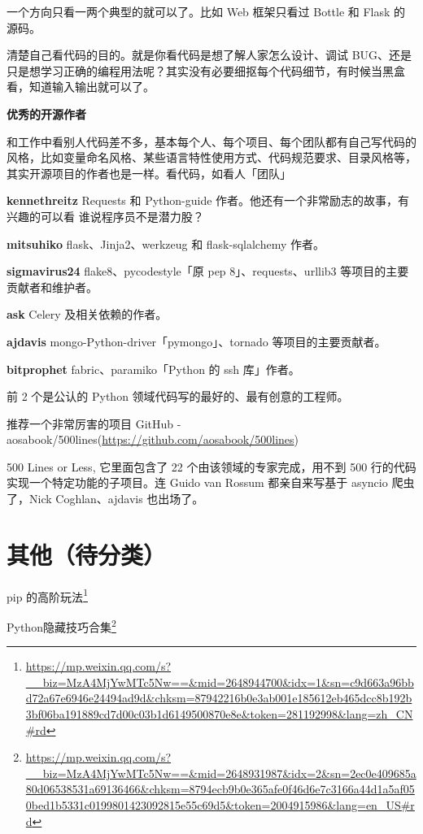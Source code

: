 \documentclass[]{ctexbook}
\renewcommand{\href}[2]{#2\footnote{\url{#1}}}
\begin{document}
一个方向只看一两个典型的就可以了。比如 Web 框架只看过 Bottle 和 Flask 的源码。

清楚自己看代码的目的。就是你看代码是想了解人家怎么设计、调试 BUG、还是只是想学习正确的编程用法呢？其实没有必要细抠每个代码细节，有时候当黑盒看，知道输入输出就可以了。

\textbf{优秀的开源作者}

和工作中看别人代码差不多，基本每个人、每个项目、每个团队都有自己写代码的风格，比如变量命名风格、某些语言特性使用方式、代码规范要求、目录风格等，其实开源项目的作者也是一样。看代码，如看人「团队」

\textbf{kennethreitz} Requests 和 Python-guide 作者。他还有一个非常励志的故事，有兴趣的可以看 谁说程序员不是潜力股？

\textbf{mitsuhiko} flask、Jinja2、werkzeug 和 flask-sqlalchemy 作者。

\textbf{sigmavirus24} flake8、pycodestyle「原 pep 8」、requests、urllib3 等项目的主要贡献者和维护者。

\textbf{ask} Celery 及相关依赖的作者。

\textbf{ajdavis} mongo-Python-driver「pymongo」、tornado 等项目的主要贡献者。

\textbf{bitprophet} fabric、paramiko「Python 的 ssh 库」作者。

前 2 个是公认的 Python 领域代码写的最好的、最有创意的工程师。

推荐一个非常厉害的项目 GitHub - aosabook/500lines(\url{https://github.com/aosabook/500lines})

500 Lines or Less, 它里面包含了 22 个由该领域的专家完成，用不到 500 行的代码实现一个特定功能的子项目。连 Guido van Rossum 都亲自来写基于 asyncio 爬虫了，Nick Coghlan、ajdavis 也出场了。

\hypertarget{ux5176ux4ed6ux5f85ux5206ux7c7b}{%
\section{其他（待分类）}\label{ux5176ux4ed6ux5f85ux5206ux7c7b}}

\href{https://mp.weixin.qq.com/s?__biz=MzA4MjYwMTc5Nw==\&mid=2648944700\&idx=1\&sn=c9d663a96bbd72a67e6946e24494ad9d\&chksm=87942216b0e3ab001e185612eb465dcc8b192b3bf06ba191889cd7d00c03b1d6149500870e8e\&token=281192998\&lang=zh_CN\#rd}{pip 的高阶玩法}

\href{https://mp.weixin.qq.com/s?__biz=MzA4MjYwMTc5Nw==\&mid=2648931987\&idx=2\&sn=2ec0e409685a80d06538531a69136466\&chksm=8794ecb9b0e365afe0f46d6e7c3166a44d1a5af050bed1b5331c0199801423092815e55c69d5\&token=2004915986\&lang=en_US\#rd}{Python隐藏技巧合集}
\end{document}
